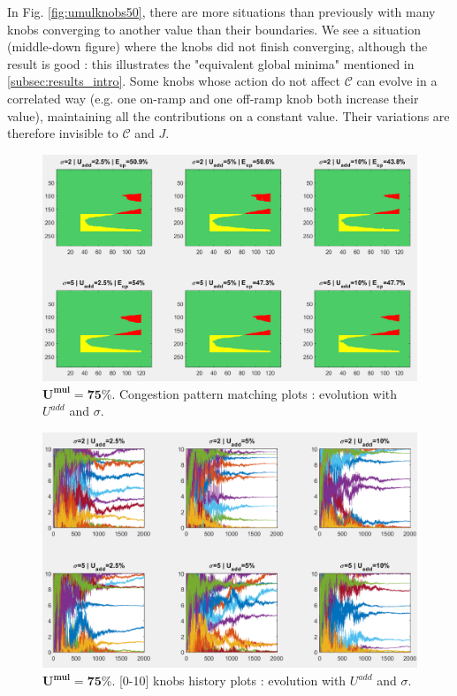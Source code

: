 In Fig. \ref{fig:umulknobs50}, there are more situations than previously with many knobs converging to another value than their  boundaries. We see a situation (middle-down figure) where the knobs did not finish converging, although the result is good : this illustrates the "equivalent global minima" mentioned in \ref{subsec:results_intro}. Some knobs whose action do not affect $\mathscr{C}$ can evolve in a correlated way (e.g. one on-ramp and one off-ramp knob both increase their value), maintaining all the contributions on a constant value. Their variations are therefore invisible to $\mathscr{C}$ and $J$.\\
\newpage
\begin{figure}[!h]
	\centering
	\caption{$\mathbf{U^{mul}=75\%}$. Congestion pattern matching plots : evolution with $U^{add}$ and $\sigma$.}
	\label{fig:umulcp75}
	\includegraphics[width=6.8in]{figures/results_figures/Umul/cp_Umul_75_lambda_11.png}
\end{figure}
\begin{figure}[!h]
	\centering
	\caption{$\mathbf{U^{mul}=75\%}$. [0-10] knobs history plots : evolution with $U^{add}$ and $\sigma$.}
	\label{fig:umulknobs75}
	\includegraphics[width=7in]{figures/results_figures/Umul/knobs_Umul_75_lambda_11.png}
\end{figure}	

